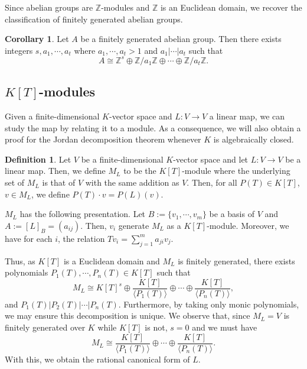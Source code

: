 \documentclass[]{article}
\theoremstyle{definition}
\newtheorem{corollary}{Corollary}[theorem]
\theoremstyle{definition}
\newtheorem{definition}{Definition}[section]
\begin{document}
Since abelian groups are \(\mathbb{Z}\)-modules and \(\mathbb{Z}\) is an 
Euclidean domain, we recover the classification of finitely generated 
abelian groups.

\begin{corollary}
  Let \(A\) be a finitely generated abelian group. Then there exists integers 
  \(s, a_1, \cdots, a_t\) where \(a_1, \cdots, a_t > 1\) and 
  \(a_1 | \cdots | a_t\) such that 
  \[A \cong \mathbb{Z}^s \oplus \mathbb{Z} / a_1 \mathbb{Z} \oplus \cdots 
    \oplus \mathbb{Z} / a_t \mathbb{Z}.\]
\end{corollary}

\subsection{\(K[T]\)-modules}

Given a finite-dimensional \(K\)-vector space and \(L : V \to V\) a linear map, 
we can study the map by relating it to a module. As a consequence, we will also 
obtain a proof for the Jordan decomposition theorem whenever \(K\) is algebraically 
closed.

\begin{definition}
  Let \(V\) be a finite-dimensional \(K\)-vector space and let 
  \(L : V \to V\) be a linear map. Then, we define \(M_L\) to be the 
  \(K[T]\)-module where the underlying set of \(M_L\) is that of \(V\) 
  with the same addition as \(V\). Then, for all \(P(T) \in K[T]\), \(v \in M_L\), 
  we define \(P(T)\cdot v = P(L)(v)\). 
\end{definition}

\(M_L\) has the following presentation. Let \(B := \{v_1, \cdots, v_m\}\) be a 
basis of \(V\) and \(A := [L]_B = (a_{ij})\). Then, \(v_i\) generate \(M_L\) 
as a \(K[T]\)-module. Moreover, we have for each \(i\), the relation 
\(Tv_i = \sum_{j = 1}^m a_{ji}v_j\).

Thus, as \(K[T]\) is a Euclidean domain and \(M_L\) is finitely generated,
there exists polynomials \(P_1(T), \cdots, P_n(T) \in K[T]\) such that 
\[M_L \cong K[T]^s \oplus \frac{K[T]}{\langle P_1(T) \rangle} \oplus \cdots 
\oplus \frac{K[T]}{\langle P_n(T) \rangle},\]
and \(P_1(T) | P_2(T) | \cdots | P_n(T)\). Furthermore, by taking only monic 
polynomials, we may ensure this decomposition is unique. We observe that, 
since \(M_L = V\) is finitely generated over \(K\) while \(K[T]\) is not, 
\(s = 0\) and we must have
\[M_L \cong \frac{K[T]}{\langle P_1(T) \rangle} \oplus \cdots 
\oplus \frac{K[T]}{\langle P_n(T) \rangle}.\]
With this, we obtain the rational canonical form of \(L\).
\end{document}
